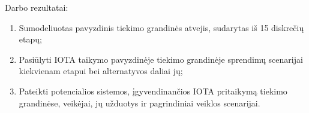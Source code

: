 
Darbo rezultatai:
\begin{enumerate}
    \item Sumodeliuotas pavyzdinis tiekimo grandinės atvejis, sudarytas iš 15 diskrečių etapų;
    \item Pasiūlyti IOTA taikymo pavyzdinėje tiekimo grandinėje sprendimų scenarijai kiekvienam etapui bei alternatyvos daliai jų;
    \item Pateikti potencialios sistemos, įgyvendinančios IOTA pritaikymą tiekimo grandinėse, veikėjai, jų užduotys ir pagrindiniai veiklos scenarijai.
\end{enumerate}

